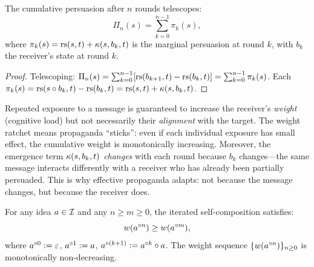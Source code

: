 \begin{theorem}
\label{thm:cumulative-persuasion}
The cumulative persuasion after $n$ rounds telescopes:
\[
\Pi_n(s) = \sum_{k=0}^{n-1} \pi_k(s),
\]
where $\pi_k(s) = \mathrm{rs}(s, t) + \kappa(s, b_k, t)$ is the marginal persuasion
at round $k$, with $b_k$ the receiver's state at round $k$.
\end{theorem}

\begin{proof}
Telescoping: $\Pi_n(s) = \sum_{k=0}^{n-1} [\mathrm{rs}(b_{k+1}, t) - \mathrm{rs}(b_k, t)]
= \sum_{k=0}^{n-1} \pi_k(s)$.
Each $\pi_k(s) = \mathrm{rs}(s \circ b_k, t) - \mathrm{rs}(b_k, t) = \mathrm{rs}(s, t) + \kappa(s, b_k, t)$.
\end{proof}

\begin{interpretation}
Repeated exposure to a message is guaranteed to increase the receiver's
\emph{weight} (cognitive load) but not necessarily their \emph{alignment}
with the target. The weight ratchet means propaganda ``sticks'': even if
each individual exposure has small effect, the cumulative weight is
monotonically increasing. Moreover, the emergence term $\kappa(s, b_k, t)$
\emph{changes} with each round because $b_k$ changes---the same message
interacts differently with a receiver who has already been partially
persuaded. This is why effective propaganda adapts: not because the message
changes, but because the receiver does.
\end{interpretation}

\begin{theorem}
\label{thm:weight-ratchet-general}
For any idea $a \in \mathcal{I}$ and any $n \geq m \geq 0$, the iterated
self-composition satisfies:
\[
w(a^{\circ n}) \geq w(a^{\circ m}),
\]
where $a^{\circ 0} := \varepsilon$, $a^{\circ 1} := a$,
$a^{\circ (k+1)} := a^{\circ k} \circ a$.
The weight sequence $\{w(a^{\circ n})\}_{n \geq 0}$ is monotonically
non-decreasing.
\end{theorem}

